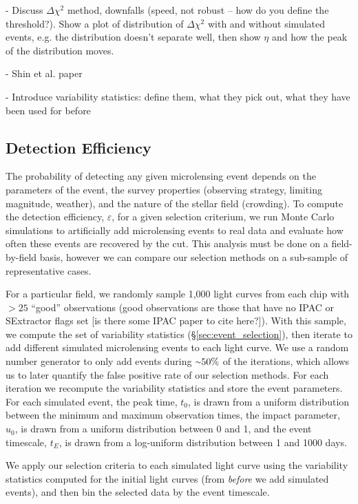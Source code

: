 \documentclass[12pt,preprint]{aastex}
\newcommand{\apwsim}{\raisebox{0.2ex}{\scriptsize$\sim$\normalsize}}
\begin{document}
- Discuss $\Delta \chi^2$ method, downfalls (speed, not robust -- how do you define the threshold?). Show a plot of distribution of $\Delta \chi^2$ with and without simulated events, e.g. the distribution doesn't separate well, then show $\eta$ and how the peak of the distribution moves.

- Shin et al. paper

- Introduce variability statistics: define them, what they pick out, what they have been used for before

\subsection{Detection Efficiency}
The probability of detecting any given microlensing event depends on the parameters of the event, the survey properties (observing strategy, limiting magnitude, weather), and the nature of the stellar field (crowding). To compute the detection efficiency, $\varepsilon$, for a given selection criterium, we run Monte Carlo simulations to artificially add microlensing events to real data and evaluate how often these events are recovered by the cut. This analysis must be done on a field-by-field basis, however we can compare our selection methods on a sub-sample of representative cases.

For a particular field, we randomly sample 1,000 light curves from each chip with $>25$ ``good'' observations (good observations are those that have no IPAC or SExtractor flags set [is there some IPAC paper to cite here?]). With this sample, we compute the set of variability statistics (\S\ref{sec:event_selection}), then iterate to add different simulated microlensing events to each light curve. We use a random number generator to only add events during $\apwsim 50\%$ of the iterations, which allows us to later quantify the false positive rate of our selection methods. For each iteration we recompute the variability statistics and store the event parameters. For each simulated event, the peak time, $t_0$, is drawn from a uniform distribution between the minimum and maximum observation times, the impact parameter, $u_0$, is drawn from a uniform distribution between 0 and 1, and the event timescale, $t_E$, is drawn from a log-uniform distribution between 1 and 1000 days. 

We apply our selection criteria to each simulated light curve using the variability statistics computed for the initial light curves (from \textit{before} we add simulated events), and then bin the selected data by the event timescale. 
\end{document}
